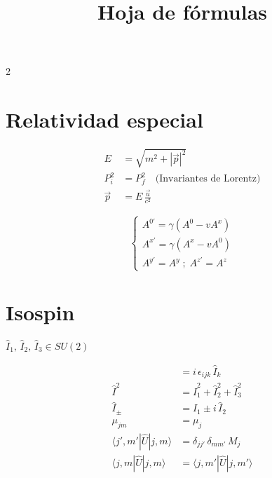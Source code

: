 \documentclass[a4paper, 12pt]{article}
\title{Hoja de fórmulas}
\author{}
\date{}
\begin{document}
\maketitle

\begin{multicols}{2}

\section*{Relatividad especial}

\begin{align*}
    E          &= \sqrt{m^{2} + |\vec{p}|^{2}}                         \\
    P_{i}^{2}  &= P_{f}^{2}
        \quad \text{(Invariantes de Lorentz)}                           \\
    \vec{p}    &= E\,\frac{\vec{u}}{c^{2}}
\end{align*}

\[
\begin{cases}
    A^{0'} = \gamma(A^{0} - v A^{x}) \\
    A^{x'} = \gamma(A^{x} - v A^{0}) \\
    A^{y'} = A^{y} \;;\; A^{z'} = A^{z}
\end{cases}
\]

\section*{Isospin}

$\hat{I}_{1},\, \hat{I}_{2},\, \hat{I}_{3} \in SU(2)$

\begin{align*}
    [\hat{I}_{i},\, \hat{I}_{j}]
        &= i\,\epsilon_{ijk}\,\hat{I}_{k}                              \\
    \hat{I}^{2}
        &= \hat{I}_{1}^{2} + \hat{I}_{2}^{2} + \hat{I}_{3}^{2}       \\
    \hat{I}_{\pm}
        &= \hat{I}_{1} \pm i\,\hat{I}_{2}                             \\
    \mu_{jm}
        &= \mu_{j}                                                     \\
    \langle j', m'|\hat{U}|j, m\rangle
        &= \delta_{jj'}\,\delta_{mm'}\,M_{j}                          \\
    \langle j, m|\hat{U}|j, m\rangle
        &= \langle j, m'|\hat{U}|j, m'\rangle
\end{align*}


\end{multicols}
\end{document}
